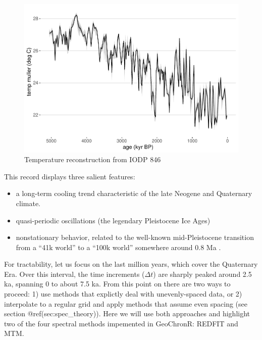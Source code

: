 \documentclass[gchron, manuscript]{copernicus}
\begin{document}
\begin{figure}
\includegraphics[width=12cm]{geoChronR-paper_files/figure-latex/odp846-timeseries-1} \caption{Temperature reconstruction from IODP 846}\label{fig:odp846-timeseries}
\end{figure}

This record displays three salient features:

\begin{itemize}
\item
  a long-term cooling trend characteristic of the late Neogene and Quaternary climate.
\item
  quasi-periodic oscillations (the legendary Pleistocene Ice Ages)
\item
  nonstationary behavior, related to the well-known mid-Pleistocene transition from a ``41k world'' to a ``100k world'' somewhere around 0.8 Ma \citep{Paillard_2001}.
\end{itemize}

For tractability, let us focus on the last million years, which cover the Quaternary Era.
Over this interval, the time increments (\(\Delta t\)) are sharply peaked around 2.5 ka, spanning 0 to about 7.5 ka.
From this point on there are two ways to proceed: 1) use methods that explictly deal with unevenly-spaced data, or 2) interpolate to a regular grid and apply methods that assume even spacing (see section @ref(sec:spec\_theory)). Here we will use both approaches and highlight two of the four spectral methods impemented in GeoChronR: REDFIT and MTM.
\end{document}
